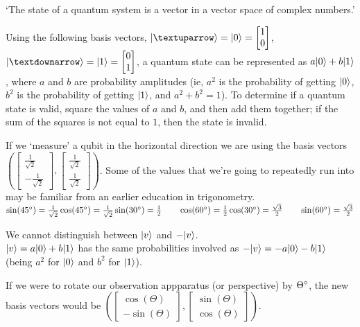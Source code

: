 
`The state of a quantum system is a vector in a vector space of complex numbers.'

Using the following basis vectors, $\ket{↑} = \ket{0} = \begin{bmatrix}
    1\\
    0
\end{bmatrix}$, $\ket{↓} = \ket{1} = \begin{bmatrix}
    0\\
    1
\end{bmatrix}$, a quantum state can be represented as $a\lvert0\rangle + b\lvert1\rangle$, where $a$ and $b$ are probability amplitudes (ie, $a^2$ is the probability of getting $\lvert0\rangle$, $b^2$ is the probability of getting $\lvert1\rangle$, and $a^2 + b^2 = 1$). To determine if a quantum state is valid, square the values of $a$ and $b$, and then add them together; if the sum of the squares is not equal to $1$, then the state is invalid.

If we `measure' a qubit in the horizontal direction we are using the basis vectors $(\begin{bmatrix}
    \frac{1}{\sqrt{2}}\\
    -\frac{1}{\sqrt{2}}
\end{bmatrix}, \begin{bmatrix}
    \frac{1}{\sqrt{2}}\\
    \frac{1}{\sqrt{2}}
\end{bmatrix})$.
Some of the values that we're going to repeatedly run into may be familiar from an earlier education in trigonometry.\\
$\sin(45\degree) = \frac{1}{\sqrt{2}}\\
\cos(45\degree) = \frac{1}{\sqrt{2}}\\
\sin(30\degree) = \frac{1}{2} \qquad \cos(60\degree) = \frac{1}{2}\\
\cos(30\degree) = \frac{\sqrt{3}}{2} \qquad \sin(60\degree) = \frac{\sqrt{3}}{2}$\\

\begin{note}
    We cannot distinguish between $\lvert v\rangle$ and $-\lvert v\rangle$.\\
    $\lvert v\rangle = a\lvert0\rangle + b\lvert1\rangle$ has the same probabilities involved as $-\lvert v\rangle = -a\lvert0\rangle - b\lvert1\rangle$ (being $a^2$ for $\lvert0\rangle$ and $b^2$ for $\lvert1\rangle$).
\end{note}

If we were to rotate our observation appparatus (or perspective) by $\Theta\degree$, the new basis vectors would be $(\begin{bmatrix}
    \cos(\Theta)\\
    -\sin(\Theta)
\end{bmatrix}, \begin{bmatrix}
    \sin(\Theta)\\
    \cos(\Theta)
\end{bmatrix})$.

